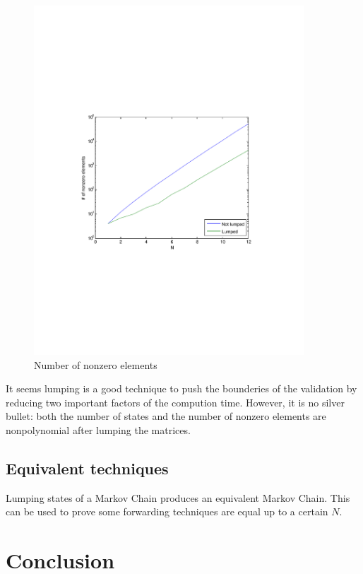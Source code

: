 \documentclass[10pt,a4paper]{article}
\begin{document}
\begin{figure}[h!tb]
\centering
\includegraphics[clip=true, trim=9em 24em 9em 24em, width=0.9\textwidth]{resources/plotlumpingnnz.pdf}
\caption{Number of nonzero elements}
\label{lumpnnz}
\end{figure}

It seems lumping is a good technique to push the bounderies of the validation by reducing two important factors of the compution time. However, it is no silver bullet: both the number of states and the number of nonzero elements are nonpolynomial after lumping the matrices.

\subsection{Equivalent techniques}
Lumping states of a Markov Chain produces an equivalent Markov Chain. This can be used to prove some forwarding techniques are equal up to a certain $N$.

\section{Conclusion}
\label{secconclusion}
\end{document}
